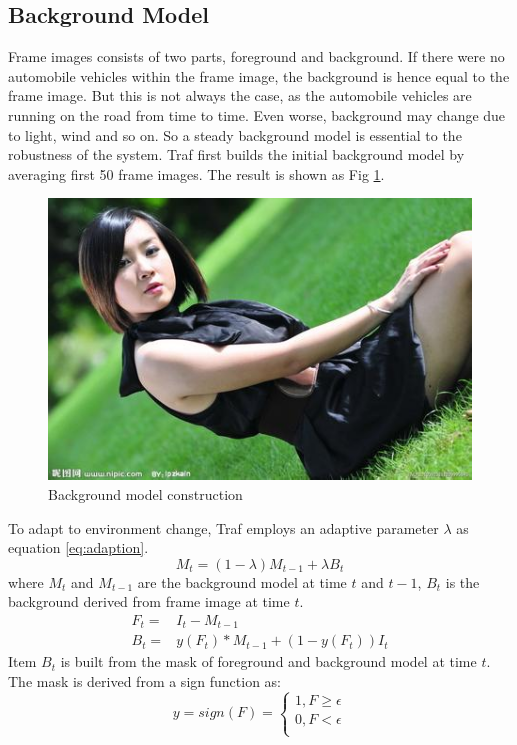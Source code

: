 \documentclass[conference]{IEEEtran}
\begin{document}
	\subsection{Background Model}
	Frame images consists of two parts, foreground and background. If there were no automobile vehicles within the frame image, the background is hence equal to the frame image. But this is not always the case, as the automobile vehicles are running on the road from time to time. Even worse, background may change due to light, wind and so on. So a steady background model is essential to the robustness of the system.
	Traf first builds the initial background model by averaging first 50 frame images. The result is shown as Fig \ref{fig:backgroundModel}.
	\begin{figure}[!h]
	\centering
	\includegraphics[width=1\linewidth]{figures/jena.jpg} 
	\caption{Background model construction}
	\label{fig:backgroundModel}
	\end{figure}
	 	
	To adapt to environment change, Traf employs an adaptive parameter $\lambda$ as equation \ref{eq:adaption}.
	\begin{equation}
	M_{t} = (1-\lambda)M_{t-1} + \lambda B_{t}
	\label{eq:adaption}
	\end{equation}
	where $M_t$ and $M_{t-1}$ are the background model at time $t$ and $t-1$, $B_{t}$ is the background derived from frame image at time $t$.
	\begin{eqnarray}	
	F_{t}=&I_{t} - M_{t-1}	\\
	B_{t}=&y(F_{t})*M_{t-1}+(1-y(F_{t}))I_{t}
	\end{eqnarray}
Item $B_{t}$ is built from the mask of foreground and background model at time $t$. The mask is derived from a sign function as:
	\begin{equation}
	  y=sign(F)=\left\{
	   \begin{aligned}
	   	1, F \geq \epsilon \\
	   	0, F < \epsilon \\
	   \end{aligned}
	   \right.
	\end{equation}			
	
\end{document}
